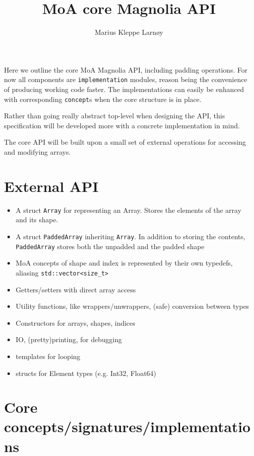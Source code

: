 \documentclass{article}
\author{Marius Kleppe Larnøy}
\begin{document}
\title{MoA core Magnolia API}
\maketitle

\noindent Here we outline the core MoA Magnolia API, including padding operations. For now all components are \texttt{implementation} modules, reason being the convenience of producing working code faster. The implementations can easily be enhanced with corresponding \texttt{concept}s when the core structure is in place.

\noindent Rather than going really abstract top-level when designing the API, this specification will be developed more with a concrete implementation in mind.

\noindent The core API will be built upon a small set of external operations for accessing and modifying arrays.

\section{External API}
\begin{itemize}
    \item A struct \texttt{Array} for representing an Array. Stores the elements of the array and its shape.
    \item A struct \texttt{PaddedArray} inheriting \texttt{Array}. In addition to storing the contents, \texttt{PaddedArray} stores both the unpadded and the padded shape

    \item MoA concepts of shape and index is represented by their own typedefs, aliasing  \texttt{std::vector<size\_t>}

    \item Getters/setters with direct array access
    \item Utility functions, like wrappers/unwrappers, (safe) conversion between types
    \item Constructors for arrays, shapes, indices
    \item IO, (pretty)printing, for debugging
    \item templates for looping
    \item structs for Element types (e.g. Int32, Float64)
\end{itemize}

\section{Core concepts/signatures/implementations}
\end{document}
